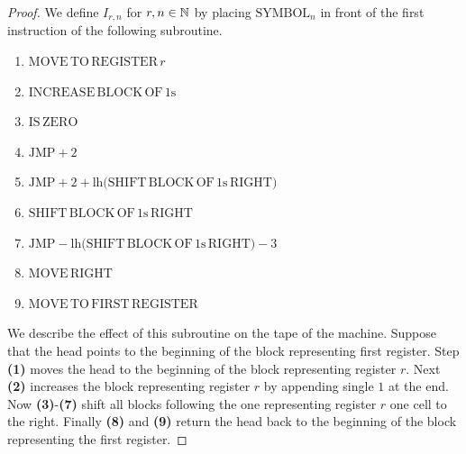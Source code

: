 \documentclass[10pt]{amsart}
\begin{document}
\begin{proof}
	We define $I_{r,n}$ for $r,n\in {\mathbb N}$ by placing $\mathrm{SYMBOL}_n$ in front of the first instruction of the following subroutine.
	\begin{enumerate}[label=\textbf{(\arabic*)}, leftmargin=3.0em]
		\item $\mathrm{MOVE\,TO\,REGISTER\,}r$
		\item $\mathrm{INCREASE\,BLOCK\,OF\,1s}$
		\item $\mathrm{IS\,ZERO}$
		\item $\mathrm{JMP}+2$
		\item $\mathrm{JMP}+2 + \mathrm{lh}\big(\mathrm{SHIFT\,BLOCK\,OF\,1s\,RIGHT}\big)$
		\item $\mathrm{SHIFT\,BLOCK\,OF\,1s\,RIGHT}$
		\item $\mathrm{JMP}-\mathrm{lh}\big(\mathrm{SHIFT\,BLOCK\,OF\,1s\,RIGHT}\big) - 3$
		\item $\mathrm{MOVE\,RIGHT}$
		\item $\mathrm{MOVE\,TO\,FIRST\,REGISTER}$
	\end{enumerate}
	We describe the effect of this subroutine on the tape of the machine. Suppose that the head points to the beginning of the block representing first register. Step \textbf{(1)} moves the head to the beginning of the block representing register $r$. Next \textbf{(2)} increases the block representing register $r$ by appending single $1$ at the end. Now \textbf{(3)}-\textbf{(7)} shift all blocks following the one representing register $r$ one cell to the right. Finally \textbf{(8)} and \textbf{(9)} return the head back to the beginning of the block representing the first register.


\end{proof}
\end{document}
